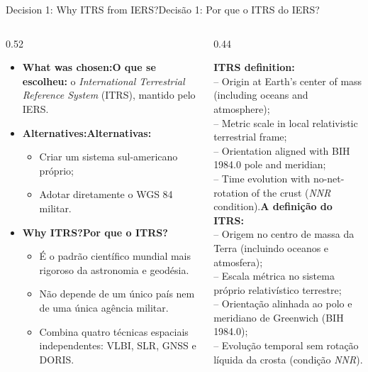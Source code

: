 \documentclass[aspectratio=169,11pt]{beamer}
\newcommand{\tr}[2]{\ifEN#2\else#1\fi}
\begin{document}
\begin{frame}{\tr{Decisão 1: Por que o ITRS do IERS?}{Decision 1: Why ITRS from IERS?}}
  \begin{columns}[onlytextwidth]
    \begin{column}{0.52\textwidth}
      \begin{itemize}
        \setlength{\itemsep}{4pt}
        \scriptsize
        \item \textbf{\tr{O que se escolheu:}{What was chosen:}} o \emph{International Terrestrial
              Reference System} (ITRS), mantido pelo IERS.
        \item \textbf{\tr{Alternativas:}{Alternatives:}}
              \begin{itemize}
                \tiny
                \item Criar um sistema sul-americano próprio;
                \item Adotar diretamente o WGS 84 militar.
              \end{itemize}
        \item \textbf{\tr{Por que o ITRS?}{Why ITRS?}}
              \begin{itemize}
                \tiny
                \item É o padrão científico mundial mais rigoroso da astronomia e geodésia.
                \item Não depende de um único país nem de uma única agência militar.
                \item Combina quatro técnicas espaciais independentes: VLBI, SLR, GNSS e DORIS.
              \end{itemize}
      \end{itemize}
    \end{column}
    \begin{column}{0.44\textwidth}
      \begin{ideia}
        \scriptsize
        \tr{\textbf{A definição do ITRS:}\\[2pt]
        -- Origem no centro de massa da Terra (incluindo oceanos e atmosfera);\\[2pt]
        -- Escala métrica no sistema próprio relativístico terrestre;\\[2pt]
        -- Orientação alinhada ao polo e meridiano de Greenwich (BIH 1984.0);\\[2pt]
        -- Evolução temporal sem rotação líquida da crosta (condição \emph{NNR}).}{\textbf{ITRS definition:}\\[2pt]
        -- Origin at Earth's center of mass (including oceans and atmosphere);\\[2pt]
        -- Metric scale in local relativistic terrestrial frame;\\[2pt]
        -- Orientation aligned with BIH 1984.0 pole and meridian;\\[2pt]
        -- Time evolution with no-net-rotation of the crust (\emph{NNR} condition).}
      \end{ideia}
    \end{column}
  \end{columns}
\end{frame}
\end{document}
